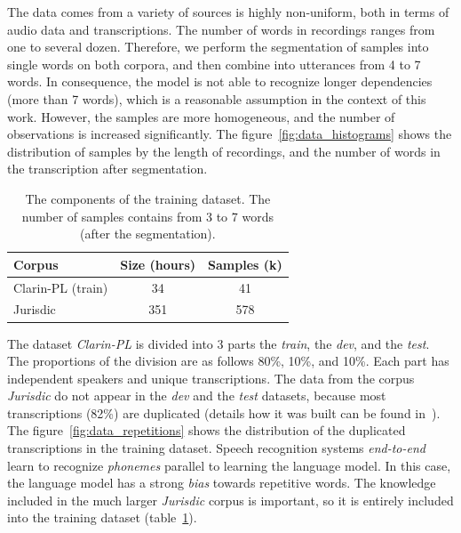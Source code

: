 The data comes from a variety of sources is highly non-uniform, both in terms of audio data and transcriptions.
The number of words in recordings ranges from one to several dozen.
Therefore, we perform the segmentation of samples into single words on both corpora, and then
combine into utterances from 4 to 7 words.
In consequence, the model is not able to recognize longer dependencies (more than 7 words),
which is a reasonable assumption in the context of this work.
However, the samples are more homogeneous, and the number of observations is increased significantly.
The figure~\ref{fig:data_histograms} shows the distribution of samples by the length of recordings,
and the number of words in the transcription after segmentation.

\begin{table}[h]
\vspace*{10pt} 
\centering
 \begin{tabular}{l c c}
  \toprule
  Corpus & Size (hours) & Samples (k) \\
  \midrule
  Clarin-PL (train) & 34  & 41 \\
  Jurisdic & 351 & 578 \\
  \bottomrule
 \end{tabular}
\caption{
The components of the training dataset.
The number of samples contains from 3 to 7 words (after the segmentation).
}
\label{table:train_dataset}
\end{table}

The dataset \textit{Clarin-PL} is divided into 3 parts the \textit{train}, the \textit{dev}, and the \textit{test}.
The proportions of the division are as follows 80\%, 10\%, and 10\%.
Each part has independent speakers and unique transcriptions.
The data from the corpus \textit{Jurisdic} do not appear in the \textit{dev} and the \textit{test} datasets,
because most transcriptions (82\%) are duplicated (details how it was built can be found in~\cite{demenko2008}).
The figure~\ref{fig:data_repetitions} shows the distribution of the duplicated transcriptions
in the training dataset.
Speech recognition systems \textit{end-to-end} learn to recognize \textit{phonemes} parallel
to learning the language model.
In this case, the language model has a strong \textit{bias} towards repetitive words.
The knowledge included in the much larger \textit{Jurisdic} corpus is important, so it is
entirely included into the training dataset (table~\ref{table:train_dataset}).

